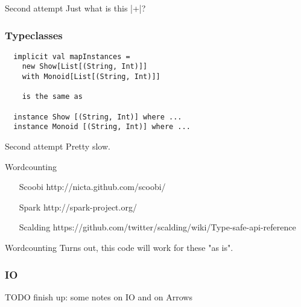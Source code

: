\documentclass{beamer}
\begin{document}
\begin{frame}{Second attempt}
  Just what is this |+|?
\end{frame}

\begin{frame}[fragile]
\frametitle{Typeclasses}
\begin{lstlisting}
  implicit val mapInstances =
    new Show[List[(String, Int)]]
    with Monoid[List[(String, Int)]]

    is the same as

  instance Show [(String, Int)] where ...
  instance Monoid [(String, Int)] where ...
\end{lstlisting}
\end{frame}

\begin{frame}{Second attempt}
  Pretty slow.
\end{frame}

\begin{frame}{Wordcounting}
\begin{enumerate}
  \item[Scoobi] http://nicta.github.com/scoobi/
  \item[Spark] http://spark-project.org/
  \item[Scalding] https://github.com/twitter/scalding/wiki/Type-safe-api-reference
\end{enumerate}
\end{frame}

\begin{frame}{Wordcounting}
  Turns out, this code will work for these "as is".
\end{frame}

\begin{frame}[fragile]
\frametitle{IO}
TODO finish up: some notes on IO and on Arrows
\end{frame}
\end{document}
